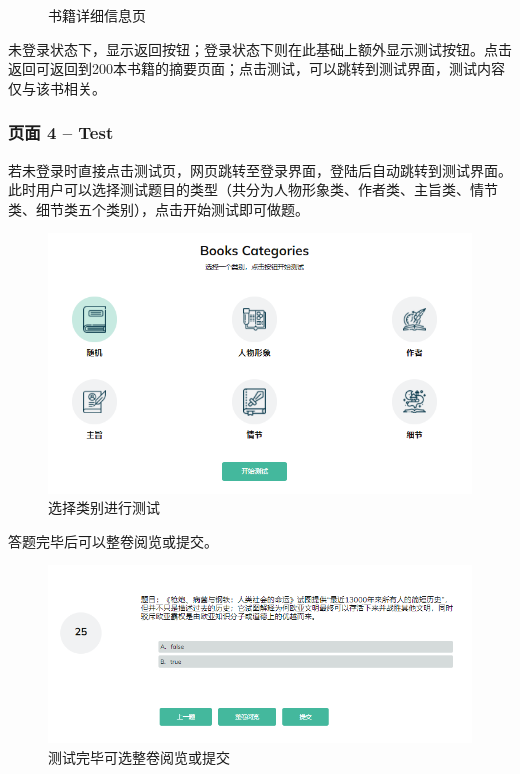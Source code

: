 \documentclass[twoside,11pt]{article}
\begin{document}
\begin{figure}[htbp]
\begin{minipage}[t]{0.5\linewidth}
        \caption{书籍详细信息页}\label{fig:bookDetail}
    \end{minipage}
\end{figure}

未登录状态下，显示返回按钮；登录状态下则在此基础上额外显示测试按钮。点击返回可返回到200本书籍的摘要页面；点击测试，可以跳转到测试界面，测试内容仅与该书相关。

\subsubsection{页面 4 -- Test}

若未登录时直接点击测试页，网页跳转至登录界面，登陆后自动跳转到测试界面。此时用户可以选择测试题目的类型（共分为人物形象类、作者类、主旨类、情节类、细节类五个类别），点击开始测试即可做题。

\begin{figure}[H]
    \centering
    \includegraphics[width=0.8\columnwidth]{figures/testCate.png}
    \caption{选择类别进行测试}\label{fig:testCate}
\end{figure}

答题完毕后可以整卷阅览或提交。

\begin{figure}[H]
    \centering
    \includegraphics[width=0.8\columnwidth]{figures/testSubmit.png}
    \caption{测试完毕可选整卷阅览或提交}\label{fig:testSubmit}
\end{figure}
\end{document}
